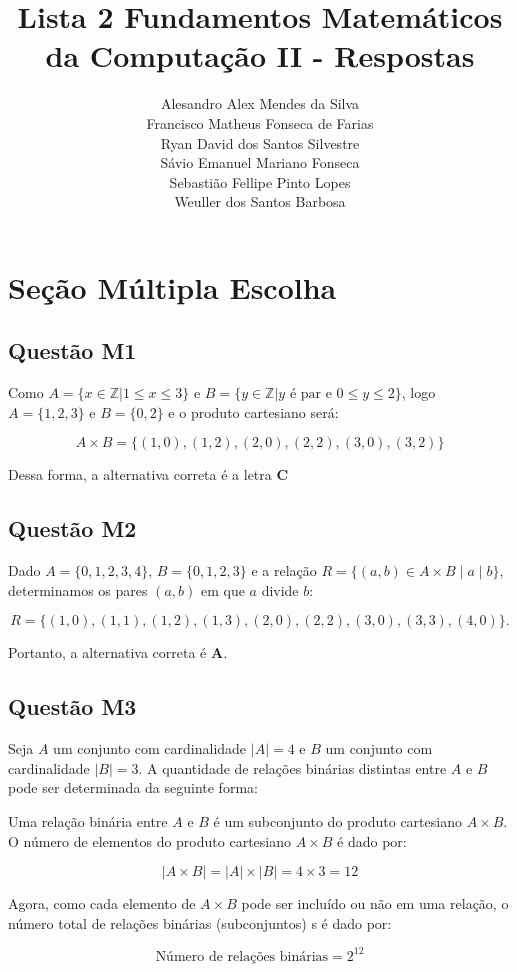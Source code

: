\documentclass{article}
\title{Lista 2 Fundamentos Matemáticos da Computação II - Respostas}
\author{Alesandro Alex Mendes da Silva\\
        Francisco Matheus Fonseca de Farias\\
        Ryan David dos Santos Silvestre\\
        Sávio Emanuel Mariano Fonseca\\
        Sebastião Fellipe Pinto Lopes\\
        Weuller dos Santos Barbosa}
\begin{document}
\maketitle

\section{Seção Múltipla Escolha}

\subsection{Questão M1} 
Como $A = \{x \in \mathbb{Z} | 1 \leq x \leq 3\}$ e $B = \{y \in \mathbb{Z} | y \text{ é par e } 0 \leq y \leq 2\}$, logo $A = \{1,2,3\}$ e $B = \{0,2\}$ e o produto cartesiano será:

\[
    A \times B = \{(1,0),(1,2),(2,0),(2,2),(3,0),(3,2)\}
\]

Dessa forma, a alternativa correta é a letra \textbf{C}


\subsection{Questão M2}
Dado \( A = \{0, 1, 2, 3, 4\} \), \( B = \{0, 1, 2, 3\} \) e a relação \( R = \{(a, b) \in A \times B \mid a \mid b\} \), determinamos os pares \((a, b)\) em que \(a\) divide \(b\):

\[
R = \{(1, 0), (1, 1), (1, 2), (1, 3), (2, 0), (2, 2), (3, 0), (3, 3), (4, 0)\}.
\]

Portanto, a alternativa correta é \textbf{A}.
\subsection{Questão M3}
Seja \( A \) um conjunto com cardinalidade \( |A| = 4 \) e \( B \) um conjunto com cardinalidade \( |B| = 3 \). A quantidade de relações binárias distintas entre \( A \) e \( B \) pode ser determinada da seguinte forma:

Uma relação binária entre \( A \) e \( B \) é um subconjunto do produto cartesiano \( A \times B \). O número de elementos do produto cartesiano \( A \times B \) é dado por:

\[
|A \times B| = |A| \times |B| = 4 \times 3 = 12
\]

Agora, como cada elemento de \( A \times B \) pode ser incluído ou não em uma relação, o número total de relações binárias (subconjuntos) s é dado por:

\[
\text{Número de relações binárias} = 2^{12}
\]
\end{document}
